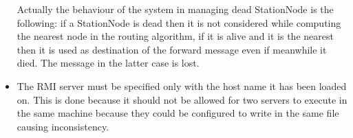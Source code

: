 \begin{itemize}
  Actually the behaviour of the system in managing dead StationNode is the
  following: if a StationNode is dead then it is not considered while 
  computing the nearest node in the routing algorithm, if it is alive and it
  is the nearest then it is used as destination of the forward message even if 
  meanwhile it died. The message in the latter case is lost.
  \item The RMI server must be specified only with the host name it has been
  loaded on. This is done because it should not be allowed for two servers
  to execute in the same machine because they could be configured to write 
  in the same file causing inconsistency.
\end{itemize}